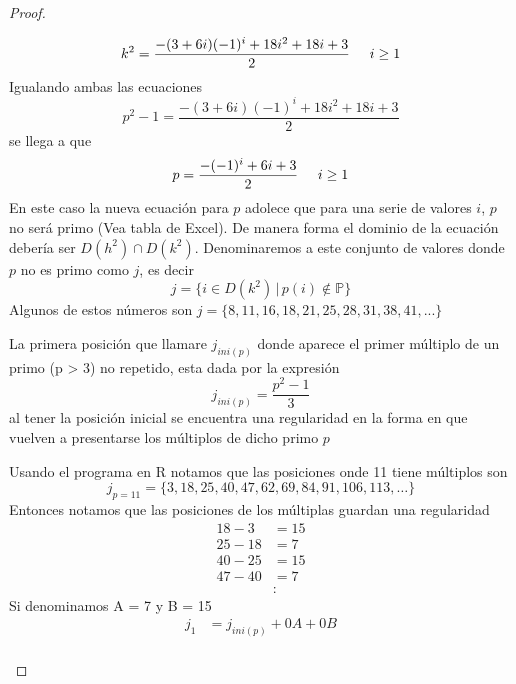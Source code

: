 \documentclass[10pt,letterpaper]{article}
\begin{document}
\begin{proof}
\begin{enumerate}
\begin{equation*}
				k^{2} = \frac{-(3 + 6i)(-1)^i + 18i^2 + 18i + 3}{2} \hspace{5mm} i \geq 1
			\end{equation*}
		Igualando ambas las ecuaciones 
		\begin{equation*}
			p^2 - 1 = \frac{-(3 + 6i)(-1)^i + 18i^2 + 18i + 3}{2}
		\end{equation*}	
			se llega a que 
			\begin{equation} \label{ec:primosP_1}
				p = 
				\frac{-(-1)^i + 6i + 3}{2} \hspace{5mm} i \geq 1 
			\end{equation}
		En este caso la nueva ecuación para $p$ adolece que para una serie de valores $i$, $p$ no será primo (Vea tabla de Excel). De manera forma el dominio de la ecuación debería ser $D(h^2) \cap D(k^2)$.
		Denominaremos a este conjunto de valores donde $p$ no es primo  como $j$, es decir
		\begin{equation}
			j = \{i \in D(k^2) \, | \, p(i) \notin \mathbb{P} \}
		\end{equation}
		Algunos de estos números son $j = \{8, 11, 16,18, 21,25,28, 31, 38, 41, ... \}$
		\end{enumerate}
	La primera posición que llamare $j_{ini(p)}$ donde aparece el primer múltiplo de un primo (p > 3) no repetido, esta dada por la expresión
	\begin{equation}
		j_{ini(p)} = \frac{p^2 - 1}{3}
	\end{equation}
	al tener la posición inicial se encuentra una regularidad en la forma en que vuelven a presentarse los múltiplos de dicho primo $p$
   \begin{ejemplof2}[Caso p = 11]
   		Usando el programa en R notamos que las posiciones onde 11 tiene múltiplos son
   		\begin{equation}
   			j_{p = 11} = \{3,    18,    25,    40,    47,    62,    69,    84,    91 ,  106,   113, \ldots \}
   		\end{equation}
   	Entonces notamos que las posiciones de los múltiplas guardan una regularidad 
   	\begin{align*}
   		18 - 3 &= 15 \\
   	25  - 18 &= 7 \\
   	40 - 25 &= 15 \\
   	47 - 40 &= 7 \\
   			&\colon
   	\end{align*}
Si denominamos A = 7 y B = 15
\begin{align*}
	j_1 &  =  j_{ini(p)} + 0A + 0B\\

\end{align*}
\end{ejemplof2}
\end{proof}
\end{document}
